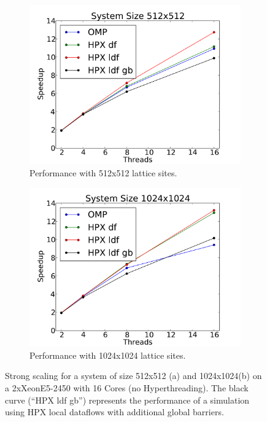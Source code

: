 \documentclass[a4wide,10pt]{scrartcl}
\begin{document}
\begin{figure}
 \begin{subfigure}[b]{0.49\textwidth}
  \centering
  \includegraphics[width=\textwidth]{../plot/marvin_scaling_512.pdf}\hfill
  \caption{Performance with 512x512 lattice sites.} 
  \label{fig:scaling_marvin_512}
 \end{subfigure}
 \begin{subfigure}[b]{0.49\textwidth}
  \centering
  \includegraphics[width=\textwidth]{../plot/marvin_scaling_1024.pdf}\hfill
  \caption{Performance with 1024x1024 lattice sites.} 
  \label{fig:scaling_marvin_1024}
 \end{subfigure}
 \caption{Strong scaling for a system of size 512x512 (a) and 1024x1024(b) on a 2xXeonE5-2450 with 16 Cores (no Hyperthreading). The black curve (``HPX ldf gb'') represents the performance of a simulation using HPX local dataflows with additional global barriers.}
\end{figure}
\end{document}
